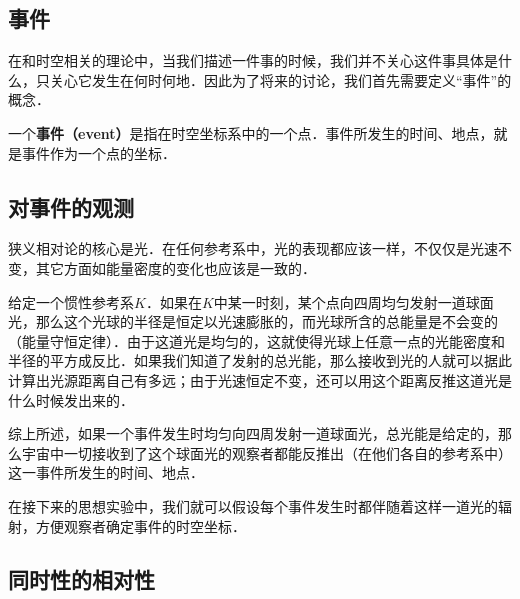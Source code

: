 

\subsection{事件}

在和时空相关的理论中，当我们描述一件事的时候，我们并不关心这件事具体是什么，只关心它发生在何时何地．因此为了将来的讨论，我们首先需要定义“事件”的概念．

一个\textbf{事件（event）}是指在时空坐标系中的一个点．事件所发生的时间、地点，就是事件作为一个点的坐标．

\subsection{对事件的观测}

狭义相对论的核心是光．在任何参考系中，光的表现都应该一样，不仅仅是光速不变，其它方面如能量密度的变化也应该是一致的．

给定一个惯性参考系$K$．如果在$K$中某一时刻，某个点向四周均匀发射一道球面光，那么这个光球的半径是恒定以光速膨胀的，而光球所含的总能量是不会变的（能量守恒定律）．由于这道光是均匀的，这就使得光球上任意一点的光能密度和半径的平方成反比．如果我们知道了发射的总光能，那么接收到光的人就可以据此计算出光源距离自己有多远；由于光速恒定不变，还可以用这个距离反推这道光是什么时候发出来的．

综上所述，如果一个事件发生时均匀向四周发射一道球面光，总光能是给定的，那么宇宙中一切接收到了这个球面光的观察者都能反推出（在他们各自的参考系中）这一事件所发生的时间、地点．

在接下来的思想实验中，我们就可以假设每个事件发生时都伴随着这样一道光的辐射，方便观察者确定事件的时空坐标．

\subsection{同时性的相对性}



